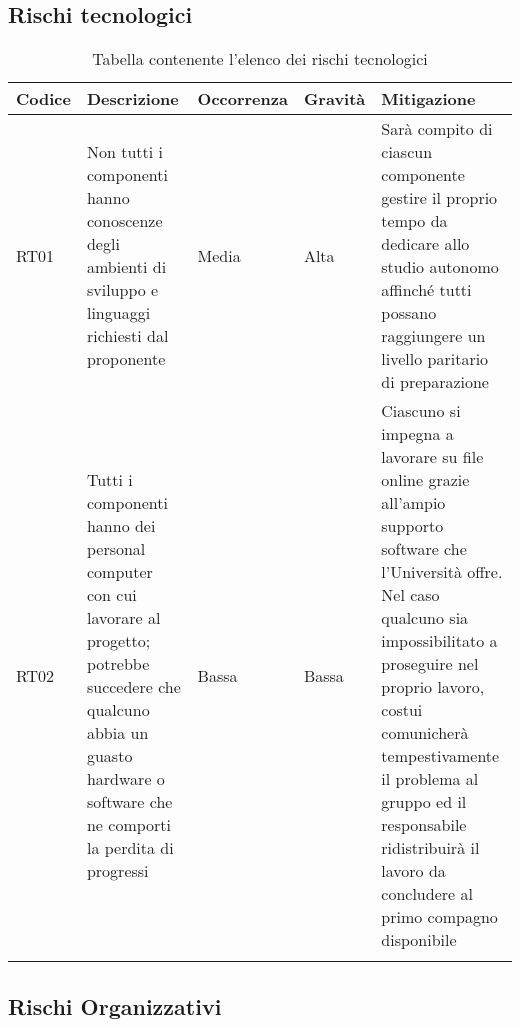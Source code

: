 \documentclass[../piano_di_progetto.tex]{subfiles}
\begin{document}
\newpage

\subsection{Rischi tecnologici}%
\label{sub:rischi_tec}

\begin{center}
	\begin{longtable}{|p{1.6cm}| p{3.5cm} | p{2cm}|p{2cm}|p{3.5cm}|}
		\hline
		\rowcolor{lightgray}
		{\textbf{Codice}} & {\textbf{Descrizione}} & {\textbf{Occorrenza}} & {\textbf{Gravità}} & {\textbf{Mitigazione}} \\

		\hline
			RT01&
			Non tutti i componenti hanno conoscenze degli ambienti di sviluppo e linguaggi richiesti dal proponente
			&
			Media
			& 
			Alta
			&
			Sarà compito di ciascun componente gestire il proprio tempo da dedicare allo studio autonomo affinché tutti possano raggiungere un livello paritario di preparazione 
\\			
			\hline
			RT02 &
			Tutti i componenti hanno dei personal computer con cui lavorare al progetto; potrebbe succedere che qualcuno abbia un guasto hardware o software che ne comporti la perdita di progressi
			&
			Bassa
			& 
			Bassa
			& 
			Ciascuno si impegna a lavorare su file online grazie all’ampio supporto software che l’Università offre. Nel caso qualcuno sia impossibilitato a proseguire nel proprio lavoro, costui comunicherà tempestivamente il problema al gruppo ed il responsabile ridistribuirà il lavoro da concludere al primo compagno disponibile\\
			\hline
			\rowcolor{white}
		\caption{Tabella contenente l'elenco dei rischi tecnologici}
	\end{longtable}

\end{center}

\subsection{Rischi Organizzativi}%
\label{sub:rischi_org}
\end{document}
